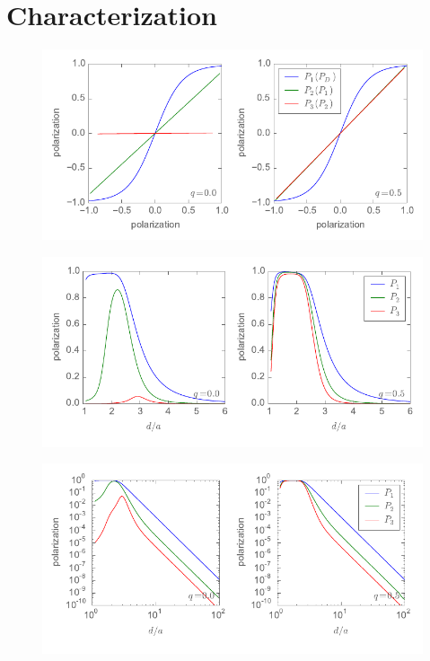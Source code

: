 \chapter{Characterization}
\graphicspath{{../gfx/chapter03/}{../plots/chapter03/}}

%
\begin{figure}
  \center
  \includegraphics{three_cells_PP}
  \caption{
  }
  \label{fig:three_cells_PP}
\end{figure}
%

%
\begin{figure}
  \center
  \includegraphics{three_cells_P_over_d}
  \caption{
  }
  \label{fig:three_cells_P_over_d}
\end{figure}
%

%
\begin{figure}
  \center
  \includegraphics{three_cells_P_over_d_log_log}
  \caption{
  }
  \label{fig:three_cells_P_over_d_log_log}
\end{figure}
%

